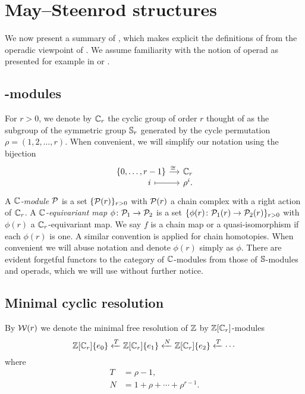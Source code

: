 
\section{May--Steenrod structures}\label{s:may_st}

We now present a summary of \cite{medina2021may_st}, which makes explicit the definitions of \cite{steenrod1953cyclic} from the operadic viewpoint of \cite{may1970general}.
We assume familiarity with the notion of operad as presented for example in \cite{may1997operads} or \cite{loday2012operads}.

\subsection{\pdfC-modules}

For $r > 0$, we denote by $\mathbb{C}_r$ the cyclic group of order $r$ thought of as the subgroup of the symmetric group $\mathbb{S}_r$ generated by the cycle permutation $\rho = (1,2,\dots,r)$.
When convenient, we will simplify our notation using the bijection
\[
\begin{tikzcd}[column sep=small,row sep=-5]
	\{0,\dots,r-1\} \rar["\cong\ "] & \cyc_r \\
	\qquad i \rar[maps to] & \rho^i.
\end{tikzcd}
\]
A \textit{$\mathbb{C}$-module} $\mathcal{P}$ is a set $\{\mathcal{P}(r)\}_{r>0}$ with $\mathcal{P}(r)$ a chain complex with a right action of $\mathbb{C}_r$.
A \textit{$\mathbb{C}$-equivariant map} $\phi \colon \mathcal{P}_1 \to \mathcal{P}_2$ is a set $\{\phi(r) \colon \mathcal{P}_1(r) \to \mathcal{P}_2(r)\}_{r>0}$ with $\phi(r)$ a $\mathbb{C}_r$-equivariant map.
We say $f$ is a chain map or a quasi-isomorphism if each $\phi(r)$ is one.
A similar convention is applied for chain homotopies.
When convenient we will abuse notation and denote $\phi(r)$ simply as $\phi$.
There are evident forgetful functors to the category of $\mathbb{C}$-modules from those of $\mathbb{S}$-modules and operads, which we will use without further notice.

\subsection{Minimal cyclic resolution}

By $\mathcal{W}(r)$ we denote the minimal free resolution of $\mathbb{Z}$ by $\mathbb{Z}[\mathbb{C}_r]$-modules
\begin{equation}\label{eq: minimal resolution}
	\mathbb{Z}[\mathbb{C}_r]\{e_0\} \xleftarrow{T} \mathbb{Z}[\mathbb{C}_r]\{e_1\} \xleftarrow{N} \mathbb{Z}[\mathbb{C}_r]\{e_2\} \xleftarrow{T} \cdots
\end{equation}
where
\begin{equation} \label{eq: T and R definition}
	\begin{split}
		T &= \rho - 1, \\
		N &= 1 + \rho + \cdots + \rho^{r-1}.
	\end{split}
\end{equation}

